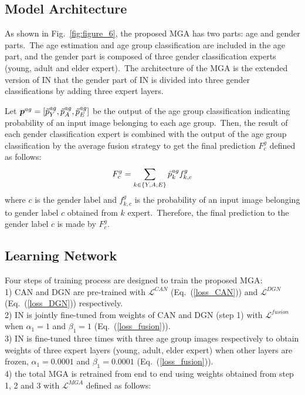 \documentclass[10pt,twocolumn,letterpaper]{article}
\begin{document}
\subsection{Model Architecture}
As shown in Fig.~\ref{fig:figure_6}, the proposed MGA has two parts: age and gender parts.~The age estimation and age group classification are included in the age part, and the gender part is composed of three gender classification experts (young, adult and elder expert).~The architecture of the MGA is the extended version of IN that the gender part of IN is divided into three gender classifications by adding three expert layers. 

Let $\boldsymbol{p}^{ag}=[\Tilde{p}^{ag}_Y, \Tilde{p}^{ag}_A, \Tilde{p}^{ag}_E]$ be the output of the age group classification indicating probability of an input image belonging to each age group.~Then, the result of each gender classification expert is combined with the output of the age group classification by the average fusion strategy to get the final prediction ${F_c^{g}}$ defined as follows:
\begin{equation}
F_c^{g}=\sum_{k\in{\{Y,A,E\}}}\Tilde{p}^{ag}_kf^{g}_{k,c}
\end{equation}
where $c$ is the gender label and $f^{g}_{k,c}$ is the probability of an input image belonging to gender label $c$ obtained from $k$ expert.~Therefore, the final prediction to the gender label $c$ is made by $F_c^{g}$.

\subsection{Learning Network}
\label{Learning Network}
Four steps of training process are designed to train the proposed MGA:\\ 
1) CAN and DGN are pre-trained with $\mathcal{L}^{CAN}$ (Eq.~(\ref{loss_CAN})) and $\mathcal{L}^{DGN}$ (Eq.~(\ref{loss_DGN})) respectively.\\
2) IN is jointly fine-tuned from weights of CAN and DGN (step 1) with $\mathcal{L}^{fusion}$ when $\alpha_1=1$ and $\beta_1=1$ (Eq.~(\ref{loss_fusion})).\\
3) IN is fine-tuned three times with three age group images respectively to obtain weights of three expert layers (young, adult, elder expert) when other layers are frozen, $\alpha_1=0.0001$ and $\beta_1=0.0001$ (Eq.~(\ref{loss_fusion})).\\
4) the total MGA is retrained from end to end using weights obtained from step 1, 2 and 3 with $\mathcal{L}^{MGA}$ defined as follows:
\end{document}
